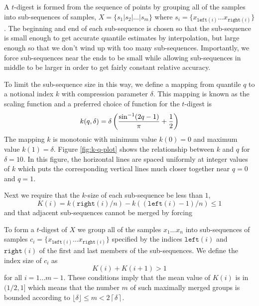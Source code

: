 \documentclass[11pt]{amsart}
\begin{document}
A $t$-digest is formed from the sequence of points by grouping all of the samples into sub-sequences of samples, $X = \lbrace s_1 | s_2 | \ldots | s_m \rbrace$ where $s_i = \lbrace x_{\mathtt {left}(i)} \ldots x_{\mathtt{right}(i)} \rbrace$.  The beginning and end of each sub-sequence is chosen so that the sub-sequence is small enough to get accurate quantile estimates by interpolation, but large enough so that we don't wind up with too many sub-sequences. Importantly, we force sub-sequences near the ends to be small while allowing sub-sequences in middle to be larger in order to get fairly constant relative accuracy.

To limit the sub-sequence size in this way, we define a mapping from quantile $q$ to a notional index $k$ with compression parameter $\delta$. This mapping is known as the scaling function and a preferred choice of function for the $t$-digest is 
\[
k(q, \delta) = \delta \left( {\frac {\sin^{-1} (2q-1)} \pi}   + {1 \over 2} \right)
\]
The mapping $k$ is monotonic with minimum value  $k(0)=0$ and maximum value  $k(1)=\delta$.  Figure \ref{fig:k-q-plot} shows the relationship between $k$ and $q$ for $\delta=10$. In this figure, the horizontal lines are spaced uniformly at integer values of $k$ which puts the corresponding vertical lines much closer together near $q=0$ and $q=1$.

Next we require that the $k$-size of each sub-sequence be less than $1$,
\[
K(i) = k \left (\mathtt{right}(i)/n \right) - k \left ((\mathtt{left}(i)-1)/n \right) \le 1
\]
and that adjacent sub-sequences cannot be merged by forcing

To form a $t$-digest of $X$ we group all of the samples $x_1 \ldots x_n$ into sub-sequences of samples $c_i = \lbrace x_{\mathtt {left}(i)} \ldots x_{\mathtt{right}(i)} \rbrace$ specified by the indices $\mathtt{left}(i)$ and $\mathtt{right}(i)$ of the first and last members of the sub-sequences. We define the index size of $c_i$ as
\[
K(i) + K(i+1) > 1
\]
for all $i=1\ldots m-1$. These conditions imply that the mean value of $K(i)$ is in $(1/2, 1]$ which means that the number $m$ of such maximally merged groups is bounded according to $ \lfloor\delta\rfloor \le m < 2\left \lceil\delta \right \rceil$. 
\end{document}
